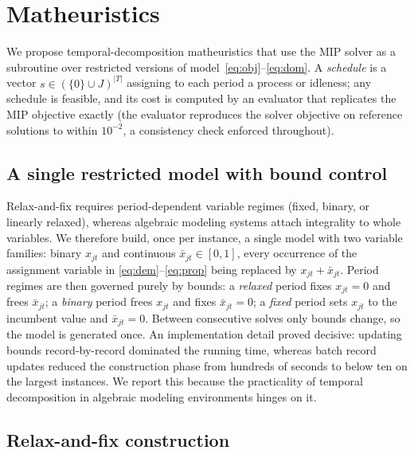 \section{Matheuristics}
\label{sec:matheuristics}

We propose temporal-decomposition matheuristics that use the MIP
solver as a subroutine over restricted versions of
model~\eqref{eq:obj}--\eqref{eq:dom}. A \emph{schedule} is a vector
$s\in(\{0\}\cup J)^{|T|}$ assigning to each period a process or
idleness; any schedule is feasible, and its cost is computed by an
evaluator that replicates the MIP objective exactly (the evaluator
reproduces the solver objective on reference solutions to within
$10^{-2}$, a consistency check enforced throughout).

\subsection{A single restricted model with bound control}
\label{sec:boundcontrol}

Relax-and-fix requires period-dependent variable regimes (fixed,
binary, or linearly relaxed), whereas algebraic modeling systems
attach integrality to whole variables. We therefore build, once per
instance, a single model with two variable families: binary $x_{jt}$
and continuous $\bar{x}_{jt}\in[0,1]$, every occurrence of the
assignment variable in \eqref{eq:dem}--\eqref{eq:prop} being replaced
by $x_{jt}+\bar{x}_{jt}$. Period regimes are then governed purely by
bounds: a \emph{relaxed} period fixes $x_{jt}=0$ and frees
$\bar{x}_{jt}$; a \emph{binary} period frees $x_{jt}$ and fixes
$\bar{x}_{jt}=0$; a \emph{fixed} period sets $x_{jt}$ to the
incumbent value and $\bar{x}_{jt}=0$. Between consecutive solves only
bounds change, so the model is generated once. An implementation
detail proved decisive: updating bounds record-by-record dominated
the running time, whereas batch record updates reduced the
construction phase from hundreds of seconds to below ten on the
largest instances. We report this because the practicality of
temporal decomposition in algebraic modeling environments hinges on
it.

\subsection{Relax-and-fix construction}
\label{sec:rf}

